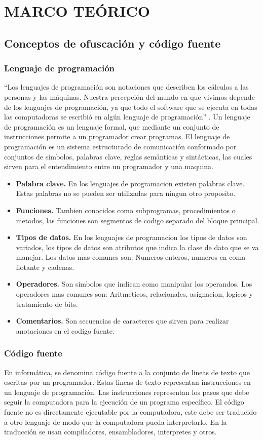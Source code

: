 \chapter{MARCO TEÓRICO}
\section{Conceptos de ofuscación y código fuente}
\subsection{Lenguaje de programación}
``Los lenguajes de programación son notaciones que describen los cálculos a las personas y las máquinas. Nuestra percepción del mundo en que vivimos depende de los lenguajes de programación, ya que todo el software que se ejecuta en todas las computadoras se escribió en algún lenguaje de programación'' \cite[p. 1]{Aho2008}. Un lenguaje de programación es un lenguaje formal, que mediante un conjunto de instrucciones permite a un programador crear programas. El lenguaje de programación es un sistema estructurado de comunicación conformado por conjuntos de símbolos, palabras clave, reglas semánticas y sintácticas, las cuales sirven para el entendimiento entre un programador y una maquina.
\begin{itemize}
    \item \textbf{Palabra clave.} En los lenguajes de programacion existen palabras clave. Estas palabras no se pueden ser utilizadas para ningun otro proposito.
    \item \textbf{Funciones.} Tambien conocidos como subprogramas, procedimientos o metodos, las funciones son segmentos de codigo separado del bloque principal.
    \item \textbf{Tipos de datos.} En los lenguajes de programacion los tipos de datos son variados, los tipos de datos son atributos que indica la clase de dato que se va manejar. Los datos mas comunes son: Numeros enteros, numeros en coma flotante y cadenas.
    \item \textbf{Operadores.} Son simbolos que indican como manipular los operandos. Los operadores mas comunes son: Aritmeticos, relacionales, asignacion, logicos y tratamiento de bits.
    \item \textbf{Comentarios.} Son secuencias de caracteres que sirven para realizar anotaciones en el codigo fuente.
\end{itemize}

\subsection{Código fuente}
En informática, se denomina código fuente a la conjunto de lineas de texto que escritas por un programador. Estas lineas de texto representan instrucciones en un lenguaje de programación. Las instrucciones representan los pasos que debe seguir la computadora para la ejecución de un programa específico. El código fuente no es directamente ejecutable por la computadora, este debe ser traducido a otro lenguaje de modo que la computadora pueda interpretarlo. En la traducción se usan compiladores, ensambladores, interpretes y otros.

